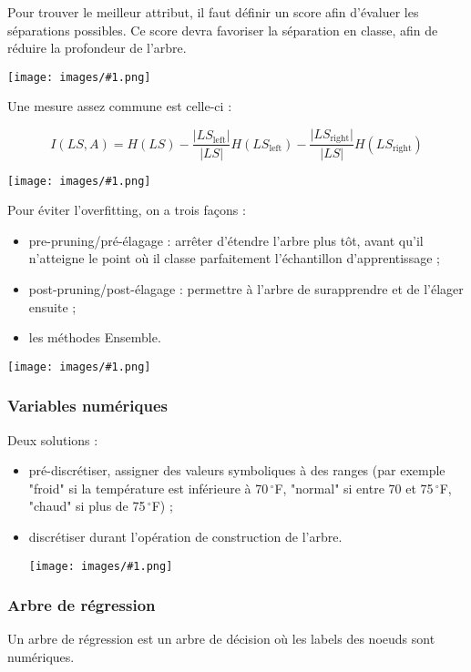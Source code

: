 \documentclass[10pt,a4paper]{report}
\newcommand{\dessin}[1]{\begin{center}\texttt{[image: images/\#1.png]}\end{center}}
\begin{document}
			Pour trouver le meilleur attribut, il faut définir un score afin d'évaluer les séparations possibles. Ce score devra favoriser la séparation en classe, afin de réduire la profondeur de l'arbre.
			
			\dessin{17}
			
			Une mesure assez commune est celle-ci :
			
			$$I(LS, A) = H(LS) - \frac{\vert LS_{\text{left}}\vert}{\vert LS\vert}H(LS_{\text{left}}) - \frac{\vert LS_{\text{right}}\vert}{\vert LS \vert}H(LS_{\text{right}})$$
			
			\dessin{18}
			
			Pour éviter l'overfitting, on a trois façons :
			
			\begin{itemize}
				\item pre-pruning/pré-élagage : arrêter d'étendre l'arbre plus tôt, avant qu'il n'atteigne le point où il classe parfaitement l'échantillon d'apprentissage ;
				\item post-pruning/post-élagage : permettre à l'arbre de surapprendre et de l'élager ensuite ;
				\item les méthodes Ensemble.
			\end{itemize}
			
			\dessin{19}
			
			\subsubsection{Variables numériques}
			
			Deux solutions :
			\begin{itemize}
				\item pré-discrétiser, assigner des valeurs symboliques à des ranges (par exemple "froid" si la température est inférieure à 70$\,^{\circ}$F, "normal" si entre 70 et 75$\,^{\circ}$F, "chaud" si plus de 75$\,^{\circ}$F) ;
				\item discrétiser durant l'opération de construction de l'arbre.
				
				\dessin{20}
			\end{itemize}
			
			\subsubsection{Arbre de régression}
			
			Un arbre de régression est un arbre de décision où les labels des noeuds sont numériques.
			
\end{document}
